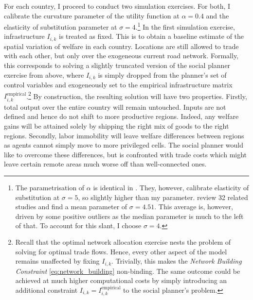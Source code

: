 \documentclass[11pt, oneside]{article}   	%
\begin{document}
For each country, I proceed to conduct two simulation exercises. For both, I calibrate the curvature parameter of the utility function at $\alpha = 0.4$ and the elasticity of substitution parameter at $\sigma=4$.\footnote{The parametrisation of $\alpha$ is identical in \cite{fajgelbaum_optimal_2017}. They, however, calibrate elasticity of substitution at $\sigma=5$, so slightly higher than my parameter. \cite{Head_GravityEquationsWorkhorse_2014} review 32 related studies and find a mean parameter of $\sigma=4.51$. This average is, however, driven by some positive outliers as the median parameter is much to the left of that. To account for this slant, I choose $\sigma=4$.} In the first simulation exercise, infrastructure $I_{i,k}$ is treated as fixed. This is to obtain a baseline estimate of the spatial variation of welfare in each country. Locations are still allowed to trade with each other, but only over the exogeneous current road network. Formally, this corresponds to solving a slightly truncated version of the social planner exercise from above, where $I_{i,k}$ is simply dropped from the planner's set of control variables and exogeneously set to the empirical infrastructure matrix $I_{i,k}^{\textrm{empirical}}$.\footnote{Recall that the optimal network allocation exercise nests the problem of solving for optimal trade flows. Hence, every other aspect of the model remains unaffected by fixing $I_{i,k}$. Trivially, this makes the \emph{Network Building Constraint} \eqref{eq:network_building} non-binding. The same outcome could be achieved at much higher computational costs by simply introducing an additional constraint $I_{i,k} = I_{i,k}^{\textrm{empirical}}$ to the social planner's problem.} By construction, the resulting solution will have two properties. Firstly, total output over the entire country will remain untouched. Inputs are not defined and hence do not shift to more productive regions. Indeed, any welfare gains will be attained solely by shipping the right mix of goods to the right regions. Secondly, labor immobility will leave welfare differences between regions as agents cannot simply move to more privileged cells. The social planner would like to overcome these differences, but is confronted with trade costs which might leave certain remote areas much worse off than well-connected ones.
\end{document}
